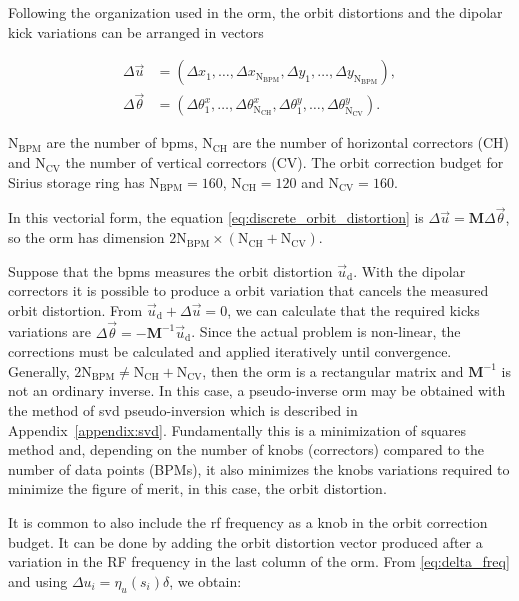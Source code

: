 Following the organization used in the \gls{orm}, the orbit distortions and the dipolar kick variations can be arranged in vectors

\begin{align*}
    \Delta \vec{u} &= \left(\Delta x_1, \ldots, \Delta x_{\mathrm{N}_{\mathrm{BPM}}}, \Delta y_1, \ldots, \Delta y_{\mathrm{N}_{\mathrm{BPM}}}\right), \\
    \Delta \vec{\theta} &= \left(\Delta \theta_1^x, \ldots, \Delta \theta_{\mathrm{N}_{\mathrm{CH}}}^x, \Delta \theta_1^y, \ldots, \Delta \theta_{\mathrm{N}_{\mathrm{CV}}}^y\right).
\end{align*}

$\mathrm{N}_{\mathrm{BPM}}$ are the number of \gls{bpm}s, $\mathrm{N}_{\mathrm{CH}}$ are the number of horizontal correctors (CH) and $\mathrm{N}_{\mathrm{CV}}$ the number of vertical correctors (CV). The orbit correction budget for Sirius storage ring has $\mathrm{N}_{\mathrm{BPM}} = 160$, $\mathrm{N}_{\mathrm{CH}} = 120$ and $\mathrm{N}_{\mathrm{CV}} = 160$. 

In this vectorial form, the equation \eqref{eq:discrete_orbit_distortion} is $\Delta \vec{u} = \mathbf{M} \Delta \vec{\theta}$, so the \gls{orm} has dimension $2 \mathrm{N}_{\mathrm{BPM}} \times \left(\mathrm{N}_{\mathrm{CH}} + \mathrm{N}_{\mathrm{CV}}\right)$. 

Suppose that the \gls{bpm}s measures the orbit distortion $\vec{u}_{\mathrm{d}}$. With the dipolar correctors it is possible to produce a orbit variation that cancels the measured orbit distortion. From $\vec{u}_{\mathrm{d}} + \Delta \vec{u} = 0$, we can calculate that the required kicks variations are $\Delta \vec{\theta} = -\mathbf{M}^{-1}\vec{u}_{\mathrm{d}}$. Since the actual problem is non-linear, the corrections must be calculated and applied iteratively until convergence. Generally, $2\mathrm{N}_{\mathrm{BPM}} \neq \mathrm{N}_{\mathrm{CH}} + \mathrm{N}_{\mathrm{CV}}$, then the \gls{orm} is a rectangular matrix and $\mathbf{M}^{-1}$ is not an ordinary inverse. In this case, a pseudo-inverse \gls{orm} may be obtained with the method of \gls{svd} pseudo-inversion which is described in Appendix~\ref{appendix:svd}. Fundamentally this is a minimization of squares method and, depending on the number of knobs (correctors) compared to the number of data points (BPMs), it also minimizes the knobs variations required to minimize the figure of merit, in this case, the orbit distortion.

It is common to also include the \gls{rf} frequency as a knob in the orbit correction budget. It can be done by adding the orbit distortion vector produced after a variation in the RF frequency in the last column of the \gls{orm}. From \eqref{eq:delta_freq} and using $\Delta u_i = \eta_u(s_i) \delta$, we obtain:

